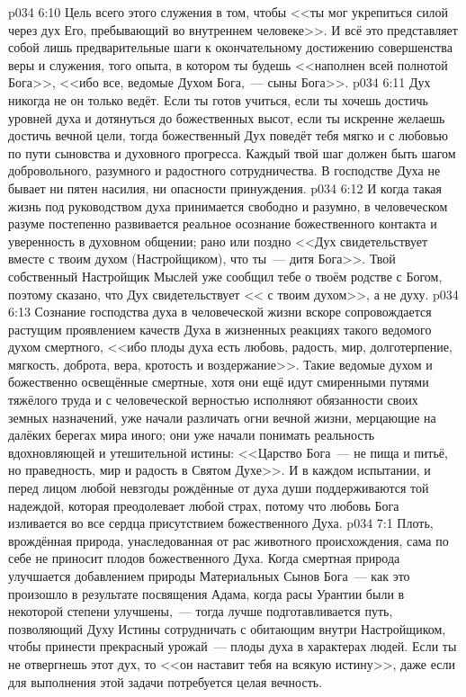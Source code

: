 \vs p034 6:10 Цель всего этого служения в том, чтобы <<ты мог укрепиться силой через дух Его, пребывающий во внутреннем человеке>>. И всё это представляет собой лишь предварительные шаги к окончательному достижению совершенства веры и служения, того опыта, в котором ты будешь <<наполнен всей полнотой Бога>>, <<ибо все, ведомые Духом Бога,~--- сыны Бога>>.
\vs p034 6:11 \pc Дух никогда не  он только ведёт. Если ты готов учиться, если ты хочешь достичь уровней духа и дотянуться до божественных высот, если ты искренне желаешь достичь вечной цели, тогда божественный Дух поведёт тебя мягко и с любовью по пути сыновства и духовного прогресса. Каждый твой шаг должен быть шагом добровольного, разумного и радостного сотрудничества. В господстве Духа не бывает ни пятен насилия, ни опасности принуждения.
\vs p034 6:12 И когда такая жизнь под руководством духа принимается свободно и разумно, в человеческом разуме постепенно развивается реальное осознание божественного контакта и уверенность в духовном общении; рано или поздно <<Дух свидетельствует вместе с твоим духом (Настройщиком), что ты~--- дитя Бога>>. Твой собственный Настройщик Мыслей уже сообщил тебе о твоём родстве с Богом, поэтому сказано, что Дух свидетельствует << с твоим духом>>, а не  духу.
\vs p034 6:13 Сознание господства духа в человеческой жизни вскоре сопровождается растущим проявлением качеств Духа в жизненных реакциях такого ведомого духом смертного, <<ибо плоды духа есть любовь, радость, мир, долготерпение, мягкость, доброта, вера, кротость и воздержание>>. Такие ведомые духом и божественно освещённые смертные, хотя они ещё идут смиренными путями тяжёлого труда и с человеческой верностью исполняют обязанности своих земных назначений, уже начали различать огни вечной жизни, мерцающие на далёких берегах мира иного; они уже начали понимать реальность вдохновляющей и утешительной истины: <<Царство Бога~--- не пища и питьё, но праведность, мир и радость в Святом Духе>>. И в каждом испытании, и перед лицом любой невзгоды рождённые от духа души поддерживаются той надеждой, которая преодолевает любой страх, потому что любовь Бога изливается во все сердца присутствием божественного Духа.
\vs p034 7:1 Плоть, врождённая природа, унаследованная от рас животного происхождения, сама по себе не приносит плодов божественного Духа. Когда смертная природа улучшается добавлением природы Материальных Сынов Бога~--- как это произошло в результате посвящения Адама, когда расы Урантии были в некоторой степени улучшены,~--- тогда лучше подготавливается путь, позволяющий Духу Истины сотрудничать с обитающим внутри Настройщиком, чтобы принести прекрасный урожай~--- плоды духа в характерах людей. Если ты не отвергнешь этот дух, то <<он наставит тебя на всякую истину>>, даже если для выполнения этой задачи потребуется целая вечность.
